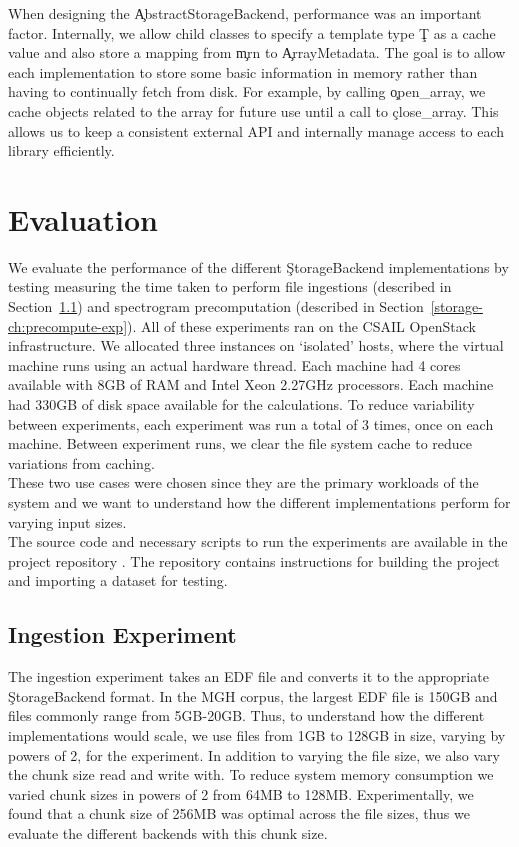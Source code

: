 When designing the \c{AbstractStorageBackend}, performance was an important
factor. Internally, we allow child classes to specify a template type \c{T} as
a cache value and also store a mapping from \c{mrn} to \c{ArrayMetadata}. The
goal is to allow each implementation to store some basic information in memory
rather than having to continually fetch from disk. For example, by calling 
\c{open\_array}, we cache objects related to the array for future
use until a call to \c{close\_array}. This allows us to keep a consistent
external API and internally manage access to each library efficiently.

\section{Evaluation}\label{storage-ch:evaluation}

We evaluate the performance of the different \c{StorageBackend} implementations
by testing measuring the time taken to perform file ingestions (described in
Section~\ref{storage-ch:ingestion-exp}) and spectrogram precomputation
(described in Section~\ref{storage-ch:precompute-exp}). All of these
experiments ran on the CSAIL OpenStack infrastructure. We allocated three
instances on `isolated' hosts, where the virtual machine runs using an actual
hardware thread. Each machine had 4 cores available with 8GB of RAM and Intel
Xeon 2.27GHz processors. Each machine had 330GB of disk space available
for the calculations. To reduce variability between experiments, each
experiment was run a total of 3 times, once on each machine. Between experiment
runs, we clear the file system cache to reduce variations from caching. \\

These two use cases were chosen since they are the primary workloads of the
system and we want to understand how the different implementations perform for
varying input sizes.\\

The source code and necessary scripts to run the experiments are available
in the project repository \cite{eeg-toolkit}. The repository contains
instructions for building the project and importing a dataset for testing.

\subsection{Ingestion Experiment}\label{storage-ch:ingestion-exp}

The ingestion experiment takes an EDF file and converts it to the appropriate
\c{StorageBackend} format. In the MGH corpus, the largest EDF file is 150GB and
files commonly range from 5GB-20GB. Thus, to understand how the different
implementations would scale, we use files from 1GB to 128GB in size, varying by
powers of 2, for the experiment. In addition to varying the file size, we also
vary the chunk size read and write with. To reduce system memory consumption we
varied chunk sizes in powers of 2 from 64MB to 128MB. Experimentally, we found
that a chunk size of 256MB was optimal across the file sizes, thus we evaluate
the different backends with this chunk size.

